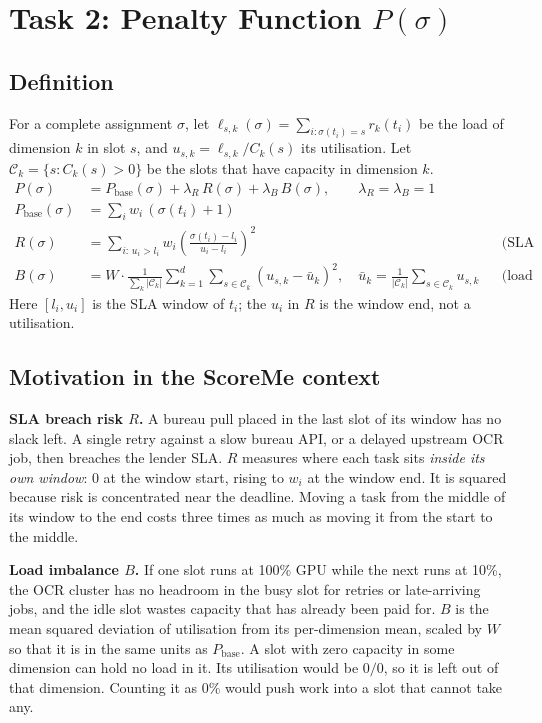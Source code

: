 \section{Task 2: Penalty Function $P(\sigma)$}

\subsection{Definition}
For a complete assignment $\sigma$, let
$\ell_{s,k}(\sigma) = \sum_{i:\sigma(t_i)=s} r_k(t_i)$ be the load of
dimension $k$ in slot $s$, and $u_{s,k} = \ell_{s,k}/C_k(s)$ its
utilisation. Let $\mathcal{C}_k = \{s : C_k(s) > 0\}$ be the slots that have
capacity in dimension $k$.
\begin{align*}
P(\sigma) &= P_{\text{base}}(\sigma) + \lambda_R\, R(\sigma) + \lambda_B\, B(\sigma),
  \qquad \lambda_R = \lambda_B = 1\\
P_{\text{base}}(\sigma) &= \sum_{i} w_i\,(\sigma(t_i)+1)\\
R(\sigma) &= \sum_{i:\,u_i > l_i} w_i \left(\frac{\sigma(t_i)-l_i}{u_i-l_i}\right)^{2}
  && \text{(SLA breach risk)}\\
B(\sigma) &= W \cdot \frac{1}{\sum_k |\mathcal{C}_k|}
  \sum_{k=1}^{d} \sum_{s\in\mathcal{C}_k} \left(u_{s,k}-\bar u_k\right)^2,
  \quad \bar u_k = \frac{1}{|\mathcal{C}_k|}\sum_{s\in\mathcal{C}_k} u_{s,k}
  && \text{(load imbalance)}
\end{align*}
Here $[l_i,u_i]$ is the SLA window of $t_i$; the $u_i$ in $R$ is the window
end, not a utilisation.

\subsection{Motivation in the ScoreMe context}
\textbf{SLA breach risk $R$.} A bureau pull placed in the last slot of its
window has no slack left. A single retry against a slow bureau API, or a
delayed upstream OCR job, then breaches the lender SLA. $R$ measures where
each task sits \emph{inside its own window}: 0 at the window start, rising to
$w_i$ at the window end. It is squared because risk is concentrated near the
deadline. Moving a task from the middle of its window to the end costs three
times as much as moving it from the start to the middle.

\textbf{Load imbalance $B$.} If one slot runs at 100\% GPU while the next
runs at 10\%, the OCR cluster has no headroom in the busy slot for retries or
late-arriving jobs, and the idle slot wastes capacity that has already been
paid for. $B$ is the mean squared deviation of utilisation from its
per-dimension mean, scaled by $W$ so that it is in the same units as
$P_{\text{base}}$. A slot with zero capacity in some dimension can hold no
load in it. Its utilisation would be $0/0$, so it is left out of that
dimension. Counting it as 0\% would push work into a slot that cannot take
any.

